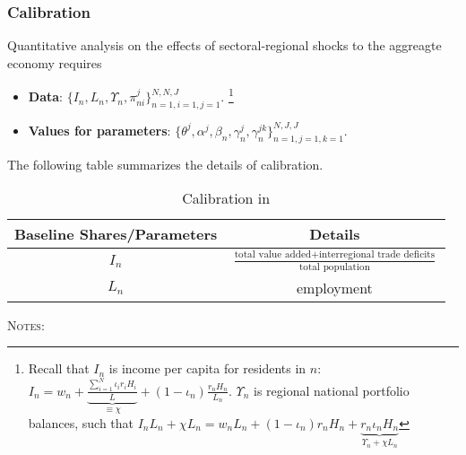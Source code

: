 \subsubsection{Calibration}
Quantitative analysis on the effects of sectoral-regional shocks to the aggreagte economy requires
\begin{itemize}
    \item \textbf{Data}: $\{I_n, L_n, \Upsilon_n, \pi_{ni}^j \}_{n=1, i =1, j=1}^{N, N, J}$.%
    \footnote{
        Recall that $I_n$ is income per capita for residents in $n$: $I_n = w_n + \underbrace{\frac{\sum_{i=1}^N \iota_i r_i H_i}{L}}_{\equiv \chi} + (1 - \iota_n) \frac{r_n H_n}{L_n}$.
        $\Upsilon_n$ is regional national portfolio balances, such that 
        $I_n L_n + \chi L_n = w_n L_n + (1-\iota_n)r_n H_n + \underbrace{r_n \iota_n H_n}_{\Upsilon_n + \chi L_n}$
    }
    \vspace{-2mm}
    \item \textbf{Values for parameters}: $\{\theta^j, \alpha^j, \beta_n, \gamma_n^j, \gamma_n^{jk}\}_{n=1,j=1,k=1}^{N,J,J}$.  
\end{itemize}

\noindent The following table summarizes the details of calibration.

\begin{table}[h]
    \caption{Calibration in \cite{Caliendo:2018}}
        \centering
        \begin{tabular}{c c} \toprule
            Baseline Shares/Parameters & Details \\ \hline
            $I_{n}$ & $\frac{\text{total value added} + \text{interregional trade deficits}}{ \text{total population}}$  \\
            $L_n$ & employment \\
            \bottomrule
        \end{tabular}
        \begin{minipage}{0.6\textwidth}{\footnotesize
            \textsc{Notes}:}
        \end{minipage}
\end{table}

